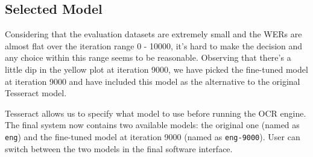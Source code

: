 \subsection{Selected Model}

Considering that the evaluation datasets are extremely small and the WERs are almost flat over the iteration range 0 - 10000, it's hard to make the decision and any choice within this range seems to be reasonable. Observing that there's a little dip in the yellow plot at iteration 9000, we have picked the fine-tuned model at iteration 9000 and have included this model as the alternative to the original Tesseract model.

Tesseract allows us to specify what model to use before running the OCR engine. The final system now contains two available models: the original one (named as \texttt{eng}) and the fine-tuned model at iteration 9000 (named as \texttt{eng-9000}). User can switch between the two models in the final software interface.